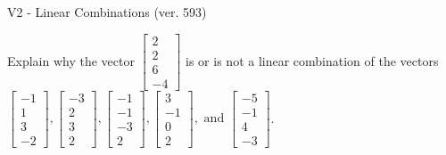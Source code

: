 \begin{exercise}
  \begin{exerciseTitle}V2 - Linear Combinations (ver. 593)\end{exerciseTitle}
  \begin{exerciseStatement}
    Explain why the vector \(\left[\begin{array}{c}
2 \\
2 \\
6 \\
-4
\end{array}\right]\)  is or is not a linear 
	combination of the vectors \(\left[\begin{array}{c}
-1 \\
1 \\
3 \\
-2
\end{array}\right] , \left[\begin{array}{c}
-3 \\
2 \\
3 \\
2
\end{array}\right] , \left[\begin{array}{c}
-1 \\
-1 \\
-3 \\
2
\end{array}\right] , \left[\begin{array}{c}
3 \\
-1 \\
0 \\
2
\end{array}\right] , \text{ and } \left[\begin{array}{c}
-5 \\
-1 \\
4 \\
-3
\end{array}\right]\).
	



\end{exerciseStatement}
\end{exercise}
